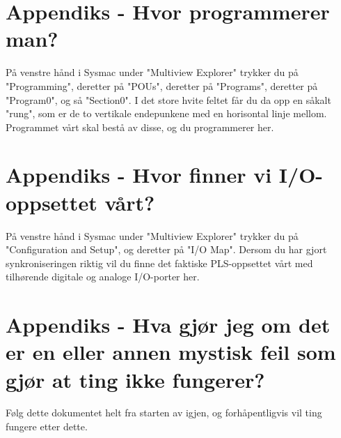 \section{Appendiks - Hvor programmerer man?}
På venstre hånd i Sysmac under "Multiview Explorer" trykker du på "Programming", deretter på "POUs", deretter på "Programs", deretter på "Program0", og så "Section0". I det store hvite feltet får du da opp en såkalt "rung", som er de to vertikale endepunkene med en horisontal linje mellom. Programmet vårt skal bestå av disse, og du programmerer her.

\section{Appendiks - Hvor finner vi I/O-oppsettet vårt?}
På venstre hånd i Sysmac under "Multiview Explorer" trykker du på "Configuration and Setup", og deretter på "I/O Map". Dersom du har gjort synkroniseringen riktig vil du finne det faktiske PLS-oppsettet vårt med tilhørende digitale og analoge I/O-porter her.

\section{Appendiks - Hva gjør jeg om det er en eller annen mystisk feil som gjør at ting ikke fungerer?}
Følg dette dokumentet helt fra starten av igjen, og forhåpentligvis vil ting fungere etter dette.